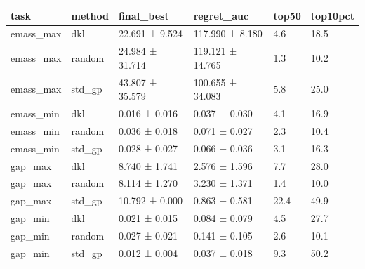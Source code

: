 \begin{tabular}{llllll}
\toprule
task & method & final_best & regret_auc & top50 & top10pct \\
\midrule
emass_max & dkl & 22.691 ± 9.524 & 117.990 ± 8.180 & 4.6 & 18.5 \\
emass_max & random & 24.984 ± 31.714 & 119.121 ± 14.765 & 1.3 & 10.2 \\
emass_max & std_gp & 43.807 ± 35.579 & 100.655 ± 34.083 & 5.8 & 25.0 \\
emass_min & dkl & 0.016 ± 0.016 & 0.037 ± 0.030 & 4.1 & 16.9 \\
emass_min & random & 0.036 ± 0.018 & 0.071 ± 0.027 & 2.3 & 10.4 \\
emass_min & std_gp & 0.028 ± 0.027 & 0.066 ± 0.036 & 3.1 & 16.3 \\
gap_max & dkl & 8.740 ± 1.741 & 2.576 ± 1.596 & 7.7 & 28.0 \\
gap_max & random & 8.114 ± 1.270 & 3.230 ± 1.371 & 1.4 & 10.0 \\
gap_max & std_gp & 10.792 ± 0.000 & 0.863 ± 0.581 & 22.4 & 49.9 \\
gap_min & dkl & 0.021 ± 0.015 & 0.084 ± 0.079 & 4.5 & 27.7 \\
gap_min & random & 0.027 ± 0.021 & 0.141 ± 0.105 & 2.6 & 10.1 \\
gap_min & std_gp & 0.012 ± 0.004 & 0.037 ± 0.018 & 9.3 & 50.2 \\
\bottomrule
\end{tabular}
